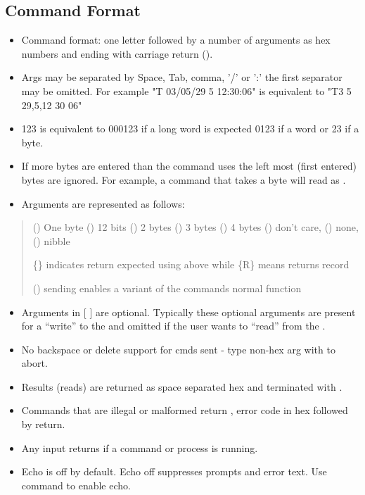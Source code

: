 \subsection*{Command Format}

\begin{itemize}
\item
  Command format: one letter followed by a number of arguments as hex
  numbers and ending with carriage return ().
\item
  Args may be separated by Space, Tab, comma, '/' or ':' the first
  separator may be omitted. For example "T 03/05/29 5 12:30:06" is
  equivalent to "T3 5 29,5,12 30 06"
\item
  123 is equivalent to 000123 if a long word is expected 0123 if a word
  or 23 if a byte.
\item
  If more bytes are entered than the command uses the left most (first
  entered) bytes are ignored. For example, a command that takes a byte
  will read  as .
\item
  Arguments are represented as follows:
\end{itemize}

\begin{quote}
() One byte () 12 bits () 2 bytes () 3 bytes () 4 bytes () don't
care, () none, () nibble

\{\} indicates return expected using above while \{R\} means returns
record

() sending  enables a variant of the commands normal function
\end{quote}

\begin{itemize}
\item
  Arguments in {[} {]} are optional. Typically these optional arguments
  are present for a ``write'' to the \instType{} and omitted if the user wants
  to ``read'' from the \instType{}.

\item
  No backspace or delete support for cmds sent - type non-hex arg with
   to abort.

\item
  Results (reads) are returned as space separated hex and terminated
  with .

\item
  Commands that are illegal or malformed return , error code in hex
  followed by return.

\item
  Any input returns \cmdfont{!} if a command or process is running.

\item
  Echo is off by default. Echo off suppresses prompts and error text.
  Use  command to enable echo.
\end{itemize}


